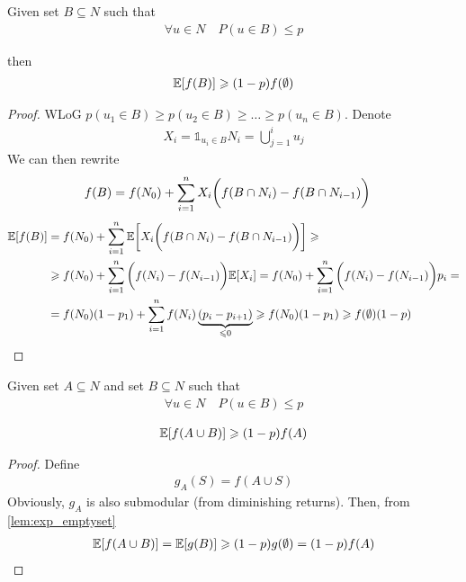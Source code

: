 \begin{lemma} \label{lem:exp_emptyset}
	Given  set $B\subseteq N$ such that
	\begin{align}
	\forall u \in  N \quad P(u\in B) \leqslant p
	\end{align}
	
	then
	\begin{align}
	\mathbb{E} \qty[f(B)] \geqslant (1-p)f(\emptyset)
	\end{align}
	\begin{proof}
		WLoG $p(u_1\in B) \geqslant p(u_2\in B) \geqslant \dots \geqslant p(u_n\in B)$. Denote 
		\begin{align}
		X_i = \mathds{1}_{u_i \in B}
		N_i = \bigcup_{j=1}^i u_j
		\end{align}
		We can then rewrite
		\begin{align}
		f(B) &= f(N_0) + \sum_{i=1}^n X_i\qty\bigg(f(B\cap N_{i}) - f(B\cap N_{i-1}))
		\end{align}
		\begin{align}
		\mathbb{E} \qty[f(B)] &= f(N_0) +\sum_{i=1}^n \mathbb{E} \qty[ X_i\qty\bigg(f(B\cap N_{i}) - f(B\cap N_{i-1}))]\geqslant\\&\geqslant f(N_0) +\sum_{i=1}^n \qty\bigg(f(N_{i}) - f(N_{i-1}))\mathbb{E} \qty[ X_i] =f(N_0) +\sum_{i=1}^n \qty\bigg(f(N_{i}) - f(N_{i-1}))p_i =\\&= f(N_0) (1-p_1) + \sum_{i=1}^n f(N_i)\underbrace{ (p_i-p_{i+1})}_{\leqslant 0} \geqslant f(N_0) (1-p_1)  \geqslant f(\emptyset) (1-p)
		\end{align}
		
	\end{proof}
\end{lemma}
\begin{lemma} \label{lem:exp}
	Given set $A\subseteq N$ and set $B\subseteq N$ such that
	\begin{align}
	\forall u \in  N \quad P(u\in B) \leqslant p
	\end{align}
	
	\begin{align}
	\mathbb{E} \qty[f(A\cup B)] \geqslant (1-p)f(A)
	\end{align}
	
	\begin{proof}
		Define
		\begin{align}
		g_A(S) = f(A\cup S) 
		\end{align}
		Obviously, $g_A$ is also submodular (from diminishing returns). Then, from \vref{lem:exp_emptyset}
		\begin{align}
		\mathbb{E} \qty[f(A\cup B)] = \mathbb{E} \qty[g(B)]\geqslant (1-p)g(\emptyset) = (1-p)f(A)
		\end{align}
	\end{proof}
\end{lemma}

